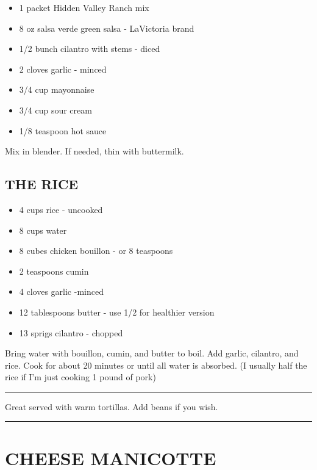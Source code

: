 \documentclass[
]{book}
\providecommand{\tightlist}{%
  \setlength{\itemsep}{0pt}\setlength{\parskip}{0pt}}
\begin{document}
\begin{itemize}
\tightlist
\item
  1 packet Hidden Valley Ranch mix
\item
  8 oz salsa verde green salsa - LaVictoria brand
\item
  1/2 bunch cilantro with stems - diced
\item
  2 cloves garlic - minced
\item
  3/4 cup mayonnaise
\item
  3/4 cup sour cream
\item
  1/8 teaspoon hot sauce
\end{itemize}

Mix in blender. If needed, thin with buttermilk.

\hypertarget{the-rice}{%
\subsection*{THE RICE}\label{the-rice}}


\begin{itemize}
\tightlist
\item
  4 cups rice - uncooked
\item
  8 cups water
\item
  8 cubes chicken bouillon - or 8 teaspoons
\item
  2 teaspoons cumin
\item
  4 cloves garlic -minced
\item
  12 tablespoons butter - use 1/2 for healthier version
\item
  13 sprigs cilantro - chopped
\end{itemize}

Bring water with bouillon, cumin, and butter to boil. Add garlic, cilantro, and rice. Cook for about 20 minutes or until all water is absorbed. (I usually half the rice if I'm just cooking 1 pound of pork)

\begin{center}\rule{0.5\linewidth}{0.5pt}\end{center}

Great served with warm tortillas. Add beans if you wish.

\begin{center}\rule{0.5\linewidth}{0.5pt}\end{center}

\hypertarget{cheese-manicotte}{%
\section*{CHEESE MANICOTTE}\label{cheese-manicotte}}
\end{document}
